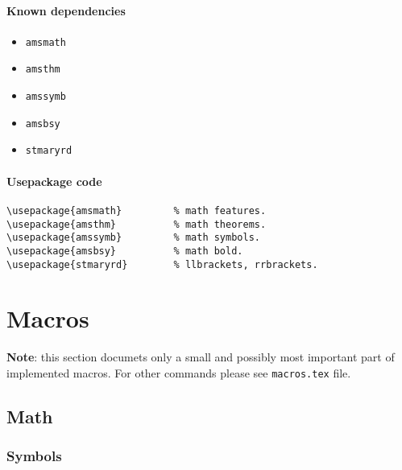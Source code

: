 \documentclass[11pt]{article}
\begin{document}
\paragraph{Known dependencies}
\begin{itemize}
	\item \texttt{amsmath}
	\item \texttt{amsthm}
	\item \texttt{amssymb}
	\item \texttt{amsbsy}
	\item \texttt{stmaryrd}
\end{itemize}

\paragraph{Usepackage code}
\begin{verbatim}
\usepackage{amsmath}         % math features.
\usepackage{amsthm}          % math theorems.
\usepackage{amssymb}         % math symbols.
\usepackage{amsbsy}          % math bold.
\usepackage{stmaryrd}        % llbrackets, rrbrackets.
\end{verbatim}

\clearpage


\section{Macros}
\label{macros}

\textbf{Note}: this section documets only a small and possibly most important part of implemented macros. For other commands please see \texttt{macros.tex} file.

\subsection{Math}

\subsubsection{Symbols}
\end{document}
